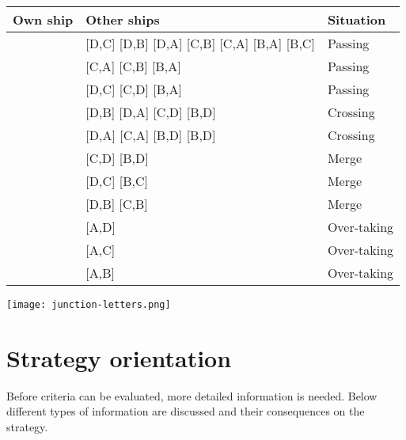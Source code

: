 \begin{minipage}{\textwidth}
	\begin{minipage}[b]{0.8\textwidth}
		\centering
		\begin{tabular}{l|l|l}
			Own ship & Other ships & Situation\\
			\hline
			\big[A,D\big] & [D,C] [D,B] [D,A] [C,B] [C,A] [B,A] [B,C] & Passing \\
			\big[A,C\big] & [C,A] [C,B] [B,A] & Passing \\
			\big[A,B\big] & [D,C] [C,D] [B,A] & Passing \\
			\big[A,C\big] & [D,B] [D,A] [C,D] [B,D] & Crossing \\
			\big[A,B\big] & [D,A] [C,A] [B,D] [B,D] & Crossing \\
			\big[A,D\big] & [C,D] [B,D] & Merge \\
			\big[A,C\big] & [D,C] [B,C] & Merge \\
			\big[A,B\big] & [D,B] [C,B] & Merge \\
			\big[A,D\big] & [A,D] & Over-taking \\
			\big[A,C\big] & [A,C] & Over-taking \\
			\big[A,B\big] & [A,B] & Over-taking \\
			
		\end{tabular}
		
		\label{tab:scenarios-standard}
	\end{minipage}
	\hfill
	\begin{minipage}[b]{0.19\textwidth}
		\centering
		\texttt{[image: junction-letters.png]}
		\label{fig:junction-letters}
	\end{minipage}
	
\end{minipage}

\begin{figure}[h]
	
\end{figure}


\begin{table}[h]
	
\end{table}


\section{Strategy orientation}
Before criteria can be evaluated, more detailed information is needed. Below different types of information are discussed and their consequences on the strategy.

